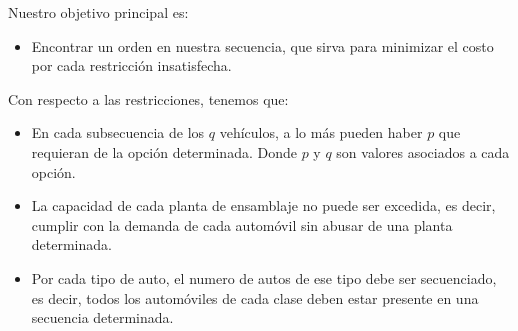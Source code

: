 Nuestro objetivo principal es:
\begin{itemize}
	\item Encontrar un orden en nuestra secuencia, que sirva para minimizar el costo por cada restricción insatisfecha.
\end{itemize}

Con respecto a las restricciones, tenemos que:
\begin{itemize}
	\item En cada subsecuencia de los $q$ vehículos, a lo más pueden haber $p$ que requieran de la opción determinada.
		Donde $p$ y $q$ son valores asociados a cada opción.
	\item La capacidad de cada planta de ensamblaje no puede ser excedida, es decir, cumplir con la demanda de cada automóvil
		sin abusar de una planta determinada.
	\item Por cada tipo de auto, el numero de autos de ese tipo debe ser secuenciado, es decir, todos los automóviles de cada clase
		deben estar presente en una secuencia determinada.
\end{itemize}



